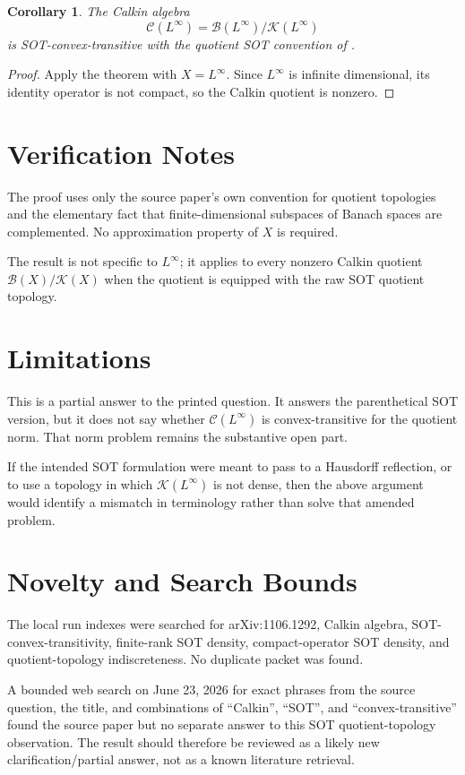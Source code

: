 \documentclass[11pt]{article}
\newtheorem{corollary}{Corollary}
\newcommand{\B}{\mathcal B}
\newcommand{\K}{\mathcal K}
\newcommand{\Calk}{\mathcal C}
\begin{document}
\begin{corollary}
The Calkin algebra
\[
  \Calk(L^\infty)=\B(L^\infty)/\K(L^\infty)
\]
is SOT-convex-transitive with the quotient SOT convention of
\cite{Talponen2011}.
\end{corollary}

\begin{proof}
Apply the theorem with \(X=L^\infty\). Since \(L^\infty\) is infinite
dimensional, its identity operator is not compact, so the Calkin quotient is
nonzero.
\end{proof}

\section*{Verification Notes}

The proof uses only the source paper's own convention for quotient topologies
and the elementary fact that finite-dimensional subspaces of Banach spaces are
complemented. No approximation property of \(X\) is required.

The result is not specific to \(L^\infty\); it applies to every nonzero
Calkin quotient \(\B(X)/\K(X)\) when the quotient is equipped with the raw SOT
quotient topology.

\section*{Limitations}

This is a partial answer to the printed question. It answers the parenthetical
SOT version, but it does not say whether \(\Calk(L^\infty)\) is convex-transitive
for the quotient norm. That norm problem remains the substantive open part.

If the intended SOT formulation were meant to pass to a Hausdorff reflection,
or to use a topology in which \(\K(L^\infty)\) is not dense, then the above
argument would identify a mismatch in terminology rather than solve that
amended problem.

\section*{Novelty and Search Bounds}

The local run indexes were searched for arXiv:1106.1292, Calkin algebra,
SOT-convex-transitivity, finite-rank SOT density, compact-operator SOT density,
and quotient-topology indiscreteness. No duplicate packet was found.

A bounded web search on June 23, 2026 for exact phrases from the source
question, the title, and combinations of ``Calkin'', ``SOT'', and
``convex-transitive'' found the source paper but no separate answer to this
SOT quotient-topology observation. The result should therefore be reviewed as
a likely new clarification/partial answer, not as a known literature retrieval.
\end{document}
